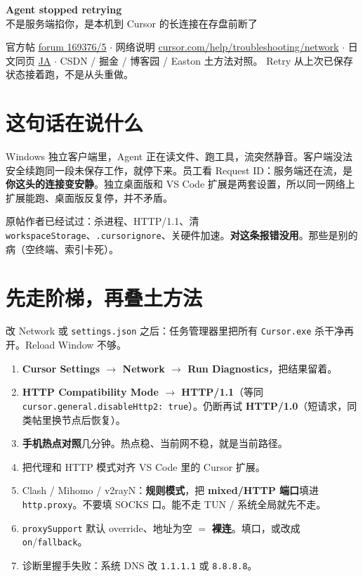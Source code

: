 \documentclass[11pt,a4paper]{ctexart}
\begin{document}
\pagecolor{paper}
\color{ink}

{\LARGE\bfseries\color{accent} Agent stopped retrying}\\[0.12em]
{\large 不是服务端掐你，是本机到 Cursor 的长连接在存盘前断了}

\vspace{0.25em}
{\color{muted}\small
官方帖 \href{https://forum.cursor.com/t/bug-agent-stopped-retrying-repeatedly-on-windows-standalone-desktop-app/169376/5}{forum 169376/5} $\cdot$
网络说明 \href{https://cursor.com/help/troubleshooting/network}{cursor.com/help/troubleshooting/network} $\cdot$
日文同页 \href{https://cursor.com/ja/help/troubleshooting/network}{JA} $\cdot$
CSDN / 掘金 / 博客园 / Easton 土方法对照。
Retry 从上次已保存状态接着跑，不是从头重做。}

\section{这句话在说什么}

Windows 独立客户端里，Agent 正在读文件、跑工具，流突然静音。客户端没法安全续跑同一段未保存工作，就停下来。员工看 Request ID：服务端还在流，是\textbf{你这头的连接变安静}。独立桌面版和 VS Code 扩展是两套设置，所以同一网络上扩展能跑、桌面版反复停，并不矛盾。

原帖作者已经试过：杀进程、HTTP/1.1、清 \texttt{workspaceStorage}、\texttt{.cursorignore}、关硬件加速。\textbf{对这条报错没用}。那些是别的病（空终端、索引卡死）。

\section{先走阶梯，再叠土方法}

改 Network 或 \texttt{settings.json} 之后：任务管理器里把所有 \texttt{Cursor.exe} 杀干净再开。Reload Window 不够。

\begin{enumerate}
  \item \textbf{Cursor Settings $\rightarrow$ Network $\rightarrow$ Run Diagnostics}，把结果留着。
  \item \textbf{HTTP Compatibility Mode $\rightarrow$ HTTP/1.1}（等同 \texttt{cursor.general.disableHttp2: true}）。仍断再试 \textbf{HTTP/1.0}（短请求，同类帖里换节点后恢复）。
  \item \textbf{手机热点对照}几分钟。热点稳、当前网不稳，就是当前路径。
  \item 把代理和 HTTP 模式对齐 VS Code 里的 Cursor 扩展。
  \item Clash / Mihomo / v2rayN：\textbf{规则模式}，把 \textbf{mixed/HTTP 端口}填进 \texttt{http.proxy}。不要填 SOCKS 口。能不走 TUN / 系统全局就先不走。
  \item \texttt{proxySupport} 默认 override、地址为空 $=$ \textbf{裸连}。填口，或改成 \texttt{on}/\texttt{fallback}。
  \item 诊断里握手失败：系统 DNS 改 \texttt{1.1.1.1} 或 \texttt{8.8.8.8}。
\end{enumerate}
\end{document}
